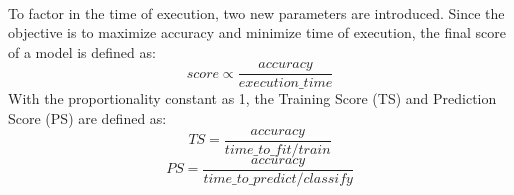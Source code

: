 \paragraph{}
To factor in the time of execution, two new parameters are introduced. Since the objective is to maximize accuracy and minimize time of execution, the final score of a model is defined as:
\begin{equation}
    score \propto \frac {accuracy} {execution\_time}
\end{equation}
With the proportionality constant as 1, the Training Score (TS) and Prediction Score (PS) are defined as:
\begin{equation}
    TS = \frac {accuracy} {time\_to\_fit/train}
\end{equation}
\begin{equation}
    PS = \frac {accuracy} {time\_to\_predict/classify}
\end{equation}
